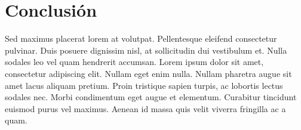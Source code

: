 \chapter{Conclusi\'on}
\label{chap:conclusion}

Sed maximus placerat lorem at volutpat. Pellentesque eleifend consectetur pulvinar. Duis posuere dignissim nisl, at sollicitudin dui vestibulum et. Nulla sodales leo vel quam hendrerit accumsan. Lorem ipsum dolor sit amet, consectetur adipiscing elit. Nullam eget enim nulla. Nullam pharetra augue sit amet lacus aliquam pretium. Proin tristique sapien turpis, ac lobortis lectus sodales nec. Morbi condimentum eget augue et elementum. Curabitur tincidunt euismod purus vel maximus. Aenean id massa quis velit viverra fringilla ac a quam. 
